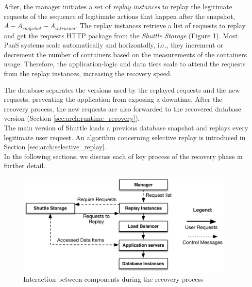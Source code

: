 After, the manager initiates a set of \textit{replay instances} to replay the legitimate requests of the sequence of legitimate actions that happen after the snapshot, $A-A_{snapshot}-A_{intrusion}$. The replay instances retrieve a list of requests to replay and get the requests \ac{HTTP} package from the \emph{Shuttle Storage} (Figure \ref{fig:replay_execution}). Most \ac{PaaS} systems scale automatically and horizontally, i.e., they increment or decrement the number of containers based on the measurements of the containers usage. Therefore, the application-logic and data tiers scale to attend the requests from the replay instances, increasing the recovery speed.

The database separates the versions used by the replayed requests and the new requests, preventing the application from exposing a downtime. After the recovery process, the new requests are also forwarded to the recovered database version (Section \ref{sec:arch:runtime_recovery}).\\


The main version of Shuttle loads a previous database snapshot and replays every legitimate user request. An algorithm concerning selective replay is introduced in Section \ref{sec:arch:selective_replay}. \\

In the following sections, we discuss each of key process of the recovery phase in further detail.

\begin{figure}
\centering
\includegraphics[width=110mm]{images/replayExecution}
\caption{Interaction between components during the recovery process}
\label{fig:replay_execution}
\end{figure}









